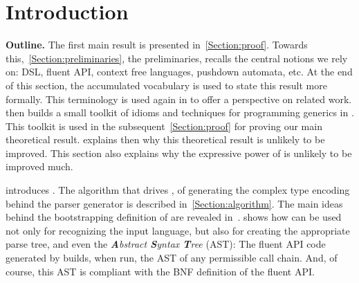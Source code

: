 \documentclass[a4paper,USenglish]{lipics}
\author{Anonymized for the submission}
\begin{document}
%

\maketitle
\begin{abstract}
  
\end{abstract}

\section{Introduction}


\textbf{Outline.}
The first main result is presented in~\cref{Section:proof}.
Towards this,~\cref{Section:preliminaries}, the preliminaries, 
  recalls the central notions we rely on: DSL, fluent API,
  context free languages, pushdown automata, etc. 
At the end of this section, the accumulated vocabulary is used to state this
  result more formally.
This terminology is used again in  to offer 
  a perspective on related work.
 then builds a small toolkit of idioms and techniques
  for programming generics in \Java.
This toolkit is used in the subsequent~\cref{Section:proof} for
  proving our main theoretical result.
 explains then why
  this theoretical result is unlikely to be improved.
This section also explains why the expressive power of \Self
  is unlikely to be improved much.

 introduces \Self.
The algorithm that drives \Self, of generating the complex
  type encoding behind the parser generator
  is described in~\cref{Section:algorithm}.
The main ideas behind the bootstrapping definition of \Self
  are revealed in~.
 shows how \Self can be used not only
  for recognizing the input language,
  but also for creating the appropriate parse tree, and even the \emph{\textbf Abstract \textbf Syntax \textbf Tree} (AST):
  The fluent API code generated by \Self builds,
    when run, the AST of any permissible call chain.
    And, of course, this AST is compliant with the BNF definition
      of the fluent API.
\end{document}
